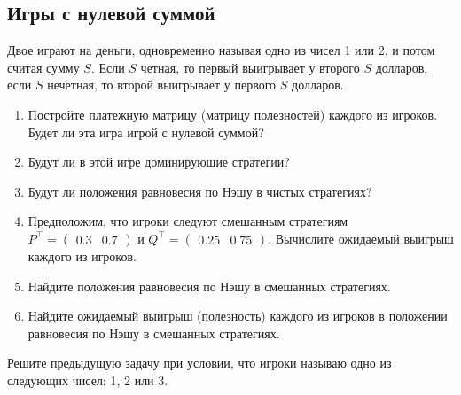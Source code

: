 
\subsection{Игры с нулевой суммой}



\begin{exercise}%
Двое играют на деньги, одновременно называя одно из чисел 1 или 2, 
и потом считая сумму $S$. Если $S$ четная, то первый выигрывает у второго $S$ долларов,
если $S$ нечетная, то второй выигрывает у первого $S$ долларов. 
\begin{enumerate}
	\item Постройте платежную матрицу (матрицу полезностей) каждого из игроков. 
	Будет ли эта игра игрой с нулевой суммой? %
	\item Будут ли в этой игре доминирующие стратегии? %
	\item Будут ли положения равновесия по Нэшу в чистых стратегиях? %
	\item Предположим, что игроки следуют смешанным стратегиям 
	\(P^\top=\begin{pmatrix} 0.3 & 0.7\end{pmatrix}\) и \(Q^\top=\begin{pmatrix} 0.25 & 0.75\end{pmatrix}\).
	Вычислите ожидаемый выигрыш каждого из игроков.
	\item Найдите положения равновесия по Нэшу в смешанных стратегиях.
	\item Найдите ожидаемый выигрыш (полезность) каждого из игроков
	в положении равновесия по Нэшу в смешанных стратегиях.
\end{enumerate}
\end{exercise}

\begin{exercise}
Решите предыдущую задачу при условии, что игроки называю одно из 
следующих чисел: 1, 2 или 3.
\end{exercise}

